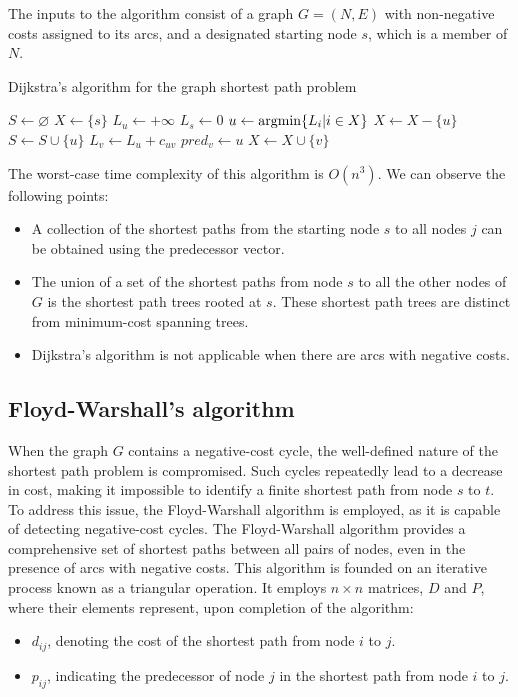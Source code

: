 The inputs to the algorithm consist of a graph $G=(N, E)$ with non-negative costs assigned to its arcs, and a designated starting node $s$, which is a member of $N$.
\begin{algorithm}[H]
    \caption{Dijkstra's algorithm for the graph shortest path problem}
        \begin{algorithmic}[1]
            \State $S \leftarrow \varnothing$
            \State $X \leftarrow \{s\}$
                \State $L_u \leftarrow +\infty$
            \EndFor
            \State $L_s \leftarrow 0$
                \State $u \leftarrow \textnormal{argmin}\{L_i|i \in X\}$
                \State $X \leftarrow X-\{u\}$
                \State $S \leftarrow S \cup \{u\}$
                    \State $L_v \leftarrow L_u+c_{uv}$
                    \State $pred_v \leftarrow u$
                    \State $X \leftarrow X \cup \{v\}$
                \EndFor
            \EndWhile
        \end{algorithmic}
\end{algorithm}
The worst-case time complexity of this algorithm is $O(n^3)$. 
We can observe the following points:
\begin{itemize}
    \item A collection of the shortest paths from the starting node $s$ to all nodes $j$ can be obtained using the predecessor vector.
    \item The union of a set of the shortest paths from node $s$ to all the other nodes of $G$ is the shortest path trees rooted at $s$. 
        These shortest path trees are distinct from minimum-cost spanning trees.
    \item Dijkstra's algorithm is not applicable when there are arcs with negative costs.
\end{itemize}

\subsection{Floyd-Warshall's algorithm}
When the graph $G$ contains a negative-cost cycle, the well-defined nature of the shortest path problem is compromised. 
Such cycles repeatedly lead to a decrease in cost, making it impossible to identify a finite shortest path from node $s$ to $t$.
To address this issue, the Floyd-Warshall algorithm is employed, as it is capable of detecting negative-cost cycles.
The Floyd-Warshall algorithm provides a comprehensive set of shortest paths between all pairs of nodes, even in the presence of arcs with negative costs. 
This algorithm is founded on an iterative process known as a triangular operation.
It employs $n \times n$ matrices, $D$ and $P$, where their elements represent, upon completion of the algorithm:
\begin{itemize}
    \item $d_{ij}$, denoting the cost of the shortest path from node $i$ to $j$.
    \item $p_{ij}$, indicating the predecessor of node $j$ in the shortest path from node $i$ to $j$.
\end{itemize}

